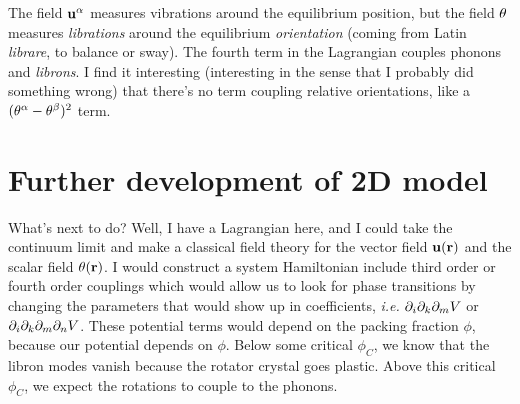 \documentclass[12pt]{article}
\begin{document}
The field $\mathbf{u}^\alpha$ measures vibrations around the equilibrium position, but the field $\theta$ measures \emph{librations} around the equilibrium \emph{orientation} (coming from Latin \emph{librare}, to balance or sway). The fourth term in the Lagrangian couples phonons and \emph{librons}. I find it interesting (interesting in the sense that I probably did something wrong) that there's no term coupling relative orientations, like a $(\theta^\alpha-\theta^\beta)^2$ term.

\section{Further development of 2D model}
What's next to do? Well, I have a Lagrangian here, and I could take the continuum limit and make a classical field theory for the vector field $\mathbf{u}(\mathbf{r})$ and the scalar field $\theta(\mathbf{r})$. I would construct a system Hamiltonian include third order or fourth order couplings which would allow us to look for phase transitions by changing the parameters that would show up in coefficients, \emph{i.e.} $\partial_i\partial_k\partial_m V$ or $\partial_i\partial_k\partial_m\partial_n V$. These potential terms would depend on the packing fraction $\phi$, because our potential depends on $\phi$. Below some critical $\phi_C$, we know that the libron modes vanish because the rotator crystal goes plastic. Above this critical $\phi_C$, we expect the rotations to couple to the phonons.
\end{document}
